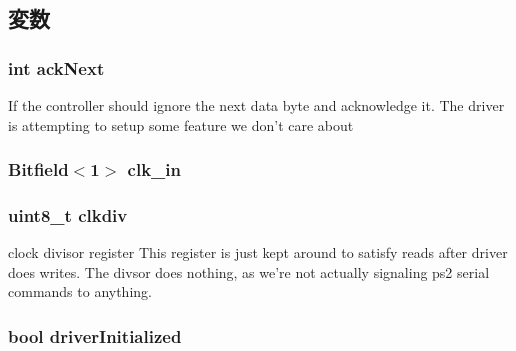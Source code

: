 \subsection{変数}
\hypertarget{classPl050_ad11eded38a493c41b578c9ca28f528f8}{
\subsubsection[{ackNext}]{\setlength{\rightskip}{0pt plus 5cm}int {\bf ackNext}}}
\label{classPl050_ad11eded38a493c41b578c9ca28f528f8}
If the controller should ignore the next data byte and acknowledge it. The driver is attempting to setup some feature we don't care about \hypertarget{classPl050_ac86e910c41bcd2b2b02875f862bc4204}{
\subsubsection[{clk\_\-in}]{\setlength{\rightskip}{0pt plus 5cm}Bitfield$<$1$>$ {\bf clk\_\-in}}}
\label{classPl050_ac86e910c41bcd2b2b02875f862bc4204}
\hypertarget{classPl050_abeb566ea63abc9ab6a987f0a6b99d0de}{
\subsubsection[{clkdiv}]{\setlength{\rightskip}{0pt plus 5cm}uint8\_\-t {\bf clkdiv}}}
\label{classPl050_abeb566ea63abc9ab6a987f0a6b99d0de}
clock divisor register This register is just kept around to satisfy reads after driver does writes. The divsor does nothing, as we're not actually signaling ps2 serial commands to anything. \hypertarget{classPl050_aed3536f6eab29208a570ebb75f43a9ce}{
\subsubsection[{driverInitialized}]{\setlength{\rightskip}{0pt plus 5cm}bool {\bf driverInitialized}}}
